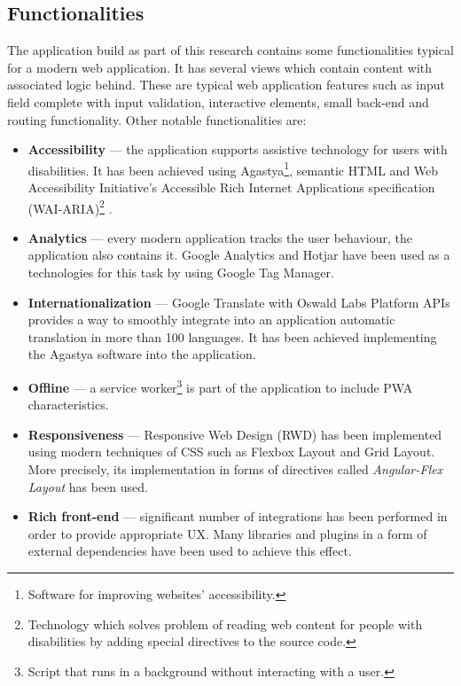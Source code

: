\documentclass{article} %
\begin{document}
\subsection{Functionalities}
The application build as part of this research contains some functionalities typical for a modern web application. It has several views which contain content with associated logic behind. These are typical web application features such as input field complete with input validation, interactive elements, small back-end and routing functionality. Other notable functionalities are:
\begin{itemize}
    \item \textbf{Accessibility} --- the application supports assistive technology for users with disabilities. It has been achieved using Agastya\footnote{Software for improving websites' accessibility.}, semantic HTML and Web Accessibility Initiative's Accessible Rich Internet Applications specification (WAI-ARIA)\footnote{Technology which solves problem of reading web content for people with disabilities by adding special directives to the source code.} \cite{bib:wai_aria}.
    \item \textbf{Analytics} --- every modern application tracks the user behaviour, the application also contains it. Google Analytics and Hotjar have been used as a technologies for this task by using Google Tag Manager.
    \item \textbf{Internationalization} --- Google Translate with Oswald Labs Platform APIs provides a way to smoothly integrate into an application automatic translation in more than 100 languages. It has been achieved implementing the Agastya software into the application.
    \item \textbf{Offline} --- a service worker\footnote{Script that runs in a background without interacting with a user.} is part of the application to include PWA characteristics.
    \item \textbf{Responsiveness} --- Responsive Web Design (RWD) has been implemented using modern techniques of CSS such as Flexbox Layout and Grid Layout. More precisely, its implementation in forms of directives called \textit{Angular-Flex Layout} has been used.
    \item \textbf{Rich front-end} --- significant number of integrations has been performed in order to provide appropriate UX. Many libraries and plugins in a form of external dependencies have been used to achieve this effect.
\end{itemize}
\end{document}
